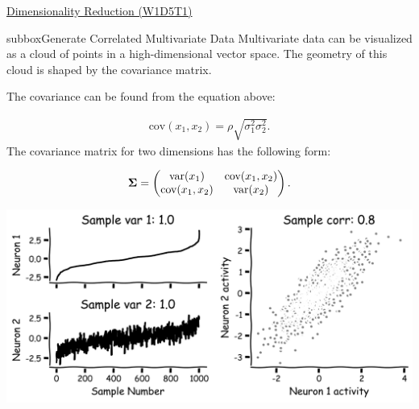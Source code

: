 \let\clearpage\relax

\begin{textbox}{\href{https://compneuro.neuromatch.io/tutorials/W1D5_DimensionalityReduction/student/W1D5_Tutorial1.html}{Dimensionality Reduction (W1D5T1)} }
\begin{subbox}{subbox}{Generate Correlated Multivariate Data}
\scriptsize
 Multivariate data can be visualized as a cloud of points in a high-dimensional vector space. The geometry of this cloud is shaped by the covariance matrix.

The covariance can be found from the equation above:

\begin{align}
\text{cov}(x_1,x_2) = \rho \sqrt{\sigma_1^2 \sigma_2^2}.
\end{align}
The covariance matrix for two dimensions has the following form:

\begin{align}
{\bf \Sigma} = 
\begin{pmatrix}
 \text{var}(x_1) & \text{cov}(x_1,x_2) \\
 \text{cov}(x_1,x_2) &\text{var}(x_2)
\end{pmatrix}.
\end{align}

\centering
\includegraphics[scale=0.15]{Figures/DM/DMFigure1.png}
\end{subbox}


\end{textbox}
